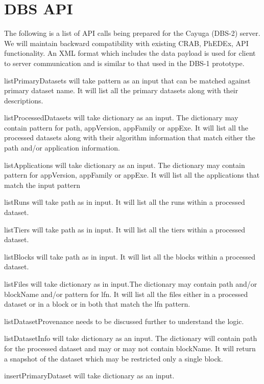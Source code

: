 \documentclass{cmspaper}
\begin{document}

\section{DBS API}

The following is a list of API calls being prepared for the Cayuga (DBS-2) server. We will maintain backward compatibility with existing CRAB, PhEDEx, API functionality. An XML format which includes the data payload is used for client to server communication and is similar to that used in the DBS-1 prototype.
\begin{description}
   \item{listPrimaryDatasets} will take pattern as an input that can be matched against primary dataset name. It will list all the primary datasets along with their descriptions.
   \item{listProcessedDatasets} will take dictionary as an input. The dictionary may contain pattern for path, appVersion, appFamily or appExe. It will list all the processed datasets along with their algorithm information that match either the path and/or application information.
   \item{listApplications} will take dictionary as an input. The dictionary may contain pattern for appVersion, appFamily or appExe. It will list all the applications that match the input pattern
   \item{listRuns} will take path as in input. It will list all the runs within a processed dataset.
   \item{listTiers} will take path as in input. It will list all the tiers within a processed dataset.
   \item{listBlocks} will take path as in input. It will list all the blocks within a processed dataset.
   \item{listFiles} will take dictionary as in input.The dictionary may contain path and/or blockName and/or pattern for lfn.  It will list all the files either in a processed dataset or in a block or in both that match the lfn pattern.
   \item{listDatasetProvenance} needs to be discussed further to understand the logic.
   \item{listDatasetInfo} will take dictionary as an input. The dictionary will contain path for the processed dataset and may or may not contain blockName. It will return a snapshot of the dataset which may be restricted only a single block.
   \item{insertPrimaryDataset} will take dictionary as an input.

\end{description}
\end{document}
